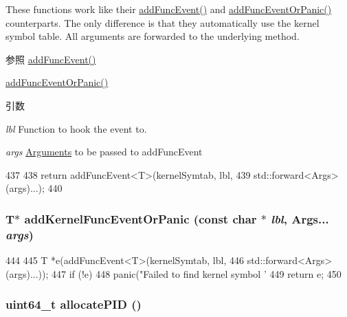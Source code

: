 These functions work like their \hyperlink{classSystem_a35e24b9d75d9b23f195b383672965a24}{addFuncEvent()} and \hyperlink{classSystem_a299ade3c625c503681f9b0f7a3812075}{addFuncEventOrPanic()} counterparts. The only difference is that they automatically use the kernel symbol table. All arguments are forwarded to the underlying method.

\begin{DoxySeeAlso}{参照}
\hyperlink{classSystem_a35e24b9d75d9b23f195b383672965a24}{addFuncEvent()} 

\hyperlink{classSystem_a299ade3c625c503681f9b0f7a3812075}{addFuncEventOrPanic()}
\end{DoxySeeAlso}

\begin{DoxyParams}{引数}
\item[{\em lbl}]Function to hook the event to. \item[{\em args}]\hyperlink{classArguments}{Arguments} to be passed to addFuncEvent \end{DoxyParams}



\begin{DoxyCode}
437     {
438         return addFuncEvent<T>(kernelSymtab, lbl,
439                                std::forward<Args>(args)...);
440     }
\end{DoxyCode}
\hypertarget{classSystem_a627f7dd0edc7fbe7567d4c2a1bf340c4}{
\subsubsection[{addKernelFuncEventOrPanic}]{\setlength{\rightskip}{0pt plus 5cm}T$\ast$ addKernelFuncEventOrPanic (const char $\ast$ {\em lbl}, \/  Args... {\em args})}}
\label{classSystem_a627f7dd0edc7fbe7567d4c2a1bf340c4}



\begin{DoxyCode}
444     {
445         T *e(addFuncEvent<T>(kernelSymtab, lbl,
446                              std::forward<Args>(args)...));
447         if (!e)
448             panic("Failed to find kernel symbol '%
449         return e;
450     }
\end{DoxyCode}
\hypertarget{classSystem_a402028e3641447d7638e44c37190c7e3}{
\subsubsection[{allocatePID}]{\setlength{\rightskip}{0pt plus 5cm}uint64\_\-t allocatePID ()}}
\label{classSystem_a402028e3641447d7638e44c37190c7e3}



